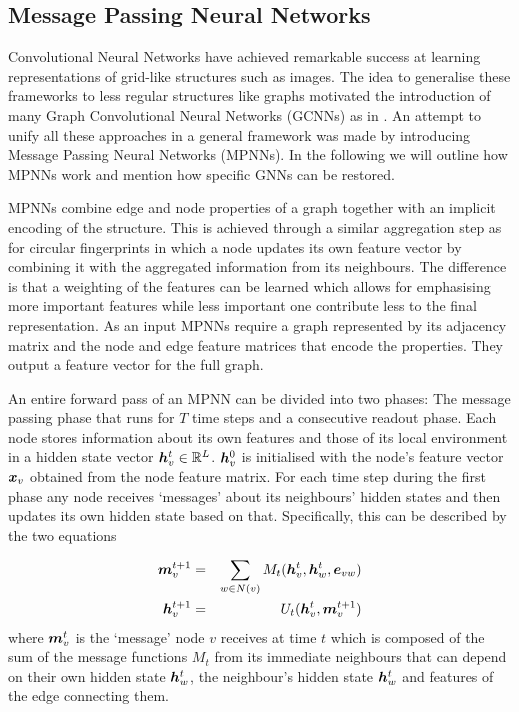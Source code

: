 \subsection{Message Passing Neural Networks}
\label{sec:MPNN}

Convolutional Neural Networks \citep{lecun1999object} have achieved remarkable success at learning representations of grid-like structures such as images. The idea to generalise these frameworks to less regular structures like graphs motivated the introduction of many Graph Convolutional Neural Networks (GCNNs) as in \citep{li2015gated,duvenaud2015convolutional,Kearnes_2016, Sch_tt_2017}. An attempt to unify all these approaches in a general framework was made by \cite{GilmerSRVD17} introducing Message Passing Neural Networks (MPNNs). In the following we will outline how MPNNs work and mention how specific GNNs can be restored. 

MPNNs combine edge and node properties of a graph together with an implicit encoding of the structure. This is achieved through a similar aggregation step as for circular fingerprints in which a node updates its own feature vector by combining it with the aggregated information from its neighbours. The difference is that a weighting of the features can be learned which allows for emphasising more important features while less important one contribute less to the final representation. As an input MPNNs require a graph represented by its adjacency matrix and the node and edge feature matrices that encode the properties. They output a feature vector for the full graph. 

An entire forward pass of an MPNN can be divided into two phases: The message passing phase that runs for $T$ time steps and a consecutive readout phase. Each node stores information about its own features and those of its local environment in a hidden state vector ${\boldsymbol h}_v^t \in {\mathbb{R}}^L$.  $\boldsymbol h_v^0$ is initialised with the node's feature vector $\boldsymbol x_v$ obtained from the node feature matrix. For each time step during the first phase any node receives `messages' about its neighbours' hidden states and then updates its own hidden state based on that. Specifically, this can be described by the two equations

\begin{eqnarray}
\boldsymbol m_v^{t+1} & =& \sum_{w\in N(v)} M_t(\boldsymbol h_v^t, \boldsymbol h_w^t, \boldsymbol e_{vw}) \label{eq:message_passing} \\
\boldsymbol h_v^{t+1} & =& U_t(\boldsymbol h_v^t, \boldsymbol m_v^{t+1})\label{eq:updating}
\end{eqnarray}
where $\boldsymbol m_v^t$ is the `message' node $v$ receives at time $t$ which is composed of the sum of the message functions $M_t$ from its immediate neighbours that can depend on their own hidden state $\boldsymbol h_w^t$, the neighbour's hidden state $\boldsymbol h_w^t$ and features of the edge connecting them.

